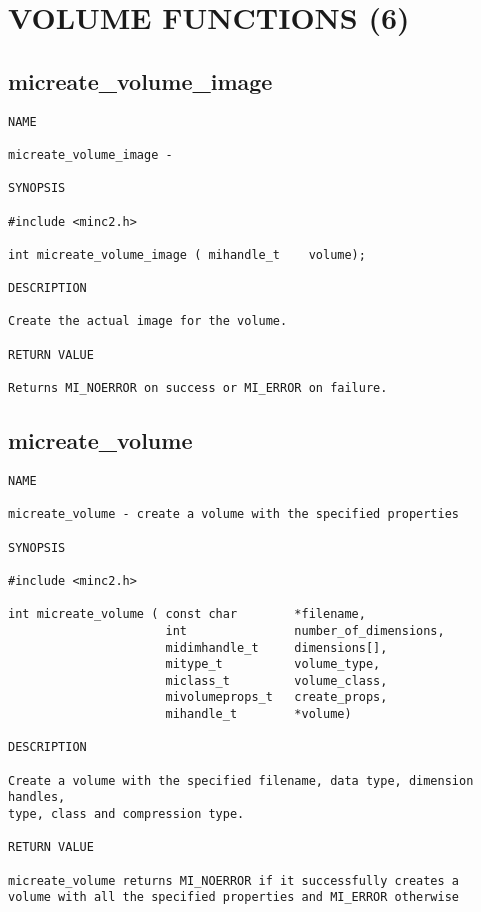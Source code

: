 \documentclass{article}
\begin{document}



                        
                                




\section{VOLUME FUNCTIONS (6)}
\subsection{micreate\_volume\_image}
\begin{verbatim}
NAME

micreate_volume_image - 

SYNOPSIS

#include <minc2.h>

int micreate_volume_image ( mihandle_t    volume);

DESCRIPTION

Create the actual image for the volume.

RETURN VALUE

Returns MI_NOERROR on success or MI_ERROR on failure.
\end{verbatim}

\subsection{micreate\_volume}
\begin{verbatim}
NAME

micreate_volume - create a volume with the specified properties

SYNOPSIS

#include <minc2.h>

int micreate_volume ( const char        *filename,
                      int               number_of_dimensions,
                      midimhandle_t     dimensions[],
                      mitype_t          volume_type,
                      miclass_t         volume_class,
                      mivolumeprops_t   create_props,
                      mihandle_t        *volume)

DESCRIPTION

Create a volume with the specified filename, data type, dimension handles,
type, class and compression type.

RETURN VALUE

micreate_volume returns MI_NOERROR if it successfully creates a
volume with all the specified properties and MI_ERROR otherwise
\end{verbatim}
\end{document}
